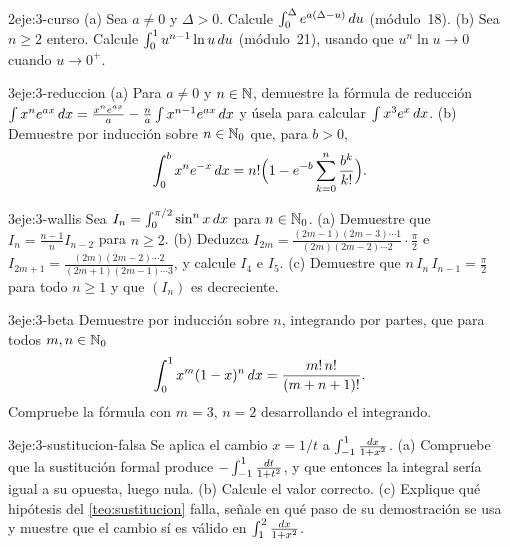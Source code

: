 \begin{ejercicio}{2}{eje:3-curso}
(a) Sea $a\neq0$ y $\Delta>0$. Calcule $\int_0^{\Delta}e^{a(\Delta-u)}\mathop{}\!d u$ (módulo~18). (b) Sea $n\ge2$ entero. Calcule $\int_0^{1}u^{n-1}\ln u\mathop{}\!d u$ (módulo~21), usando que $u^{n}\ln u\to0$ cuando $u\to0^{+}$.
\end{ejercicio}

\begin{ejercicio}{3}{eje:3-reduccion}
(a) Para $a\neq0$ y $n\in\mathbb{N}$, demuestre la fórmula de reducción $\int x^{n}e^{ax}\mathop{}\!d x=\frac{x^{n}e^{ax}}{a}-\frac{n}{a}\int x^{n-1}e^{ax}\mathop{}\!d x$ y úsela para calcular $\int x^{3}e^{x}\mathop{}\!d x$. (b) Demuestre por inducción sobre $n\in\mathbb{N}_0$ que, para $b>0$,
\[
\int_0^{b}x^{n}e^{-x}\mathop{}\!d x=n!\Bigl(1-e^{-b}\sum_{k=0}^{n}\frac{b^{k}}{k!}\Bigr).
\]
\end{ejercicio}

\begin{ejercicio}{3}{eje:3-wallis}
Sea $I_n=\int_0^{\pi/2}\sin^{n}x\mathop{}\!d x$ para $n\in\mathbb{N}_0$. (a) Demuestre que $I_n=\frac{n-1}{n}I_{n-2}$ para $n\ge2$. (b) Deduzca $I_{2m}=\frac{(2m-1)(2m-3)\cdots1}{(2m)(2m-2)\cdots2}\cdot\frac\pi2$ e $I_{2m+1}=\frac{(2m)(2m-2)\cdots2}{(2m+1)(2m-1)\cdots3}$, y calcule $I_4$ e $I_5$. (c) Demuestre que $n\,I_n\,I_{n-1}=\frac\pi2$ para todo $n\ge1$ y que $(I_n)$ es decreciente.
\end{ejercicio}

\begin{ejercicio}{3}{eje:3-beta}
Demuestre por inducción sobre $n$, integrando por partes, que para todos $m,n\in\mathbb{N}_0$
\[
\int_0^{1}x^{m}(1-x)^{n}\mathop{}\!d x=\frac{m!\,n!}{(m+n+1)!}.
\]
Compruebe la fórmula con $m=3$, $n=2$ desarrollando el integrando.
\end{ejercicio}

\begin{ejercicio}{3}{eje:3-sustitucion-falsa}
Se aplica el cambio $x=1/t$ a $\int_{-1}^{1}\frac{\mathop{}\!d x}{1+x^{2}}$. (a) Compruebe que la sustitución formal produce $-\int_{-1}^{1}\frac{\mathop{}\!d t}{1+t^{2}}$, y que entonces la integral sería igual a su opuesta, luego nula. (b) Calcule el valor correcto. (c) Explique qué hipótesis del \cref{teo:sustitucion} falla, señale en qué paso de su demostración se usa y muestre que el cambio sí es válido en $\int_{1}^{2}\frac{\mathop{}\!d x}{1+x^{2}}$.
\end{ejercicio}
